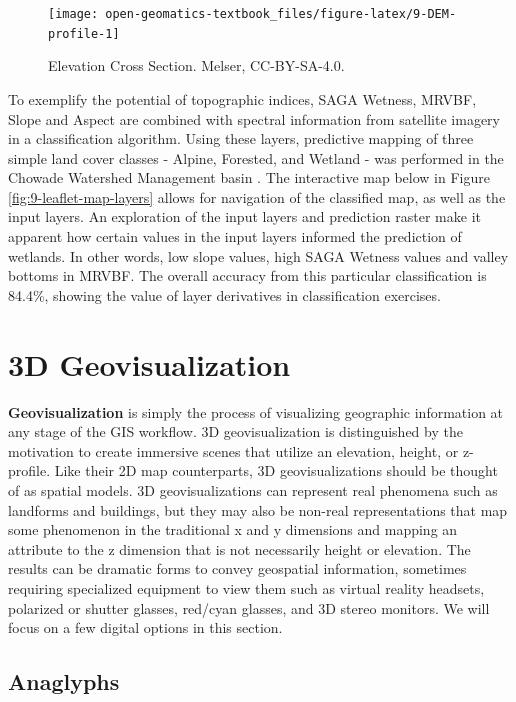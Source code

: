 \documentclass[
]{book}
\begin{document}
\begin{figure}
\texttt{[image: open-geomatics-textbook\_files/figure-latex/9-DEM-profile-1]} \caption{Elevation Cross Section. Melser, CC-BY-SA-4.0.}\label{fig:9-DEM-profile}
\end{figure}

To exemplify the potential of topographic indices, SAGA Wetness, MRVBF, Slope and Aspect are combined with spectral information from satellite imagery in a classification algorithm. Using these layers, predictive mapping of three simple land cover classes - Alpine, Forested, and Wetland - was performed in the Chowade Watershed Management basin \citep{city_of_vancouver_notitle_2009}. The interactive map below in Figure \ref{fig:9-leaflet-map-layers} allows for navigation of the classified map, as well as the input layers. An exploration of the input layers and prediction raster make it apparent how certain values in the input layers informed the prediction of wetlands. In other words, low slope values, high SAGA Wetness values and valley bottoms in MRVBF. The overall accuracy from this particular classification is 84.4\%, showing the value of layer derivatives in classification exercises.

\hypertarget{d-geovisualization}{%
\section{3D Geovisualization}\label{d-geovisualization}}

\textbf{Geovisualization} is simply the process of visualizing geographic information at any stage of the GIS workflow. 3D geovisualization is distinguished by the motivation to create immersive scenes that utilize an elevation, height, or z-profile. Like their 2D map counterparts, 3D geovisualizations should be thought of as spatial models. 3D geovisualizations can represent real phenomena such as landforms and buildings, but they may also be non-real representations that map some phenomenon in the traditional x and y dimensions and mapping an attribute to the z dimension that is not necessarily height or elevation. The results can be dramatic forms to convey geospatial information, sometimes requiring specialized equipment to view them such as virtual reality headsets, polarized or shutter glasses, red/cyan glasses, and 3D stereo monitors. We will focus on a few digital options in this section.

\hypertarget{anaglyphs}{%
\subsection{Anaglyphs}\label{anaglyphs}}
\end{document}
